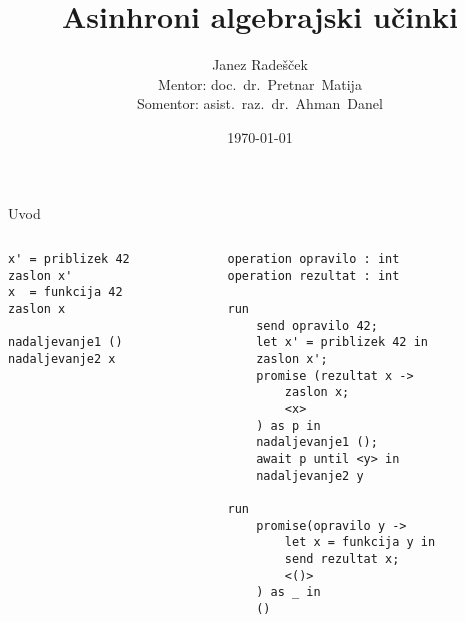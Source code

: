 \documentclass{beamer}
\theoremstyle{definition} %
\theoremstyle{plain} %
\begin{document}
	
	\title{Asinhroni algebrajski učinki}
	\author[Janez Radešček]{Janez Radešček \\[3mm] Mentor: doc.~dr.~Pretnar~Matija\\[3mm] Somentor: asist.~raz.~dr.~Ahman~Danel}
	\date{\today}
	
	\frame{\titlepage}

\begin{frame}[fragile]{Uvod}
	\begin{columns}[T]
		\tiny
		\begin{column}{0.35\textwidth}
			\begin{lstlisting}
x' = priblizek 42
zaslon x'
x  = funkcija 42
zaslon x

nadaljevanje1 ()
nadaljevanje2 x
			\end{lstlisting}
		\end{column}
		\begin{column}{0.65\textwidth}
			\begin{lstlisting}
operation opravilo : int
operation rezultat : int

run 
	send opravilo 42;
	let x' = priblizek 42 in
	zaslon x';
	promise (rezultat x ->
		zaslon x;
		<x>
	) as p in
	nadaljevanje1 ();
	await p until <y> in
	nadaljevanje2 y

run 
	promise(opravilo y ->
		let x = funkcija y in
		send rezultat x;
		<()>
	) as _ in
	()
			\end{lstlisting}
		\end{column}
	\end{columns}
\end{frame}
\end{document}
